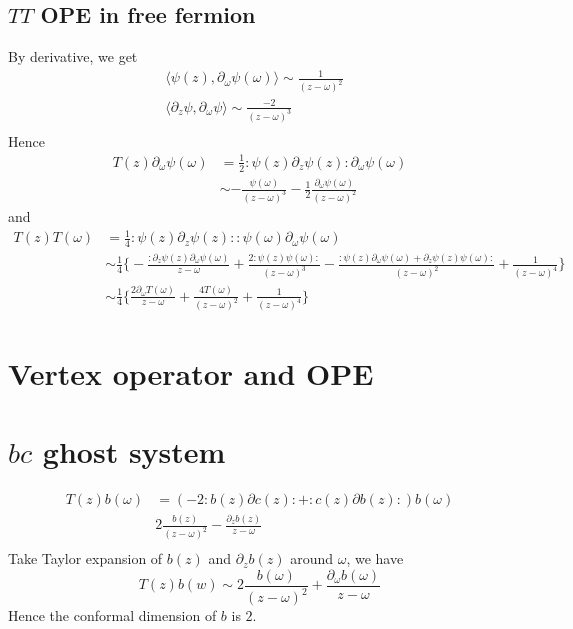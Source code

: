 \documentclass[11pt,a4paper]{article}
\theoremstyle{definition}
\begin{document}
 \subsection{$TT$ OPE in free fermion}
By derivative, we get 
\[
\begin{aligned}
\langle \psi (z), \partial_\omega \psi(\omega) \rangle \sim \frac{1}{(z-\omega)^2}& \\
 \langle \partial_z \psi , \partial_\omega \psi \rangle \sim \frac{-2}{(z-\omega)^3}&\\
\end{aligned}
\]
Hence 
\[
\begin{aligned}
T(z) \partial_\omega \psi(\omega) & = \frac{1}{2} : \psi(z) \partial_z \psi(z): \partial_\omega \psi(\omega)\\
& \sim -\frac{\psi(\omega)}{(z-\omega)^3} - \frac{1}{2} \frac{\partial_\omega \psi (\omega)}{(z-\omega)^2}
\end{aligned}
\]
and 
\[
\begin{aligned}
T(z)T(\omega) &= \frac{1}{4} : \psi(z) \partial_z \psi(z) :: \psi(\omega) \partial_\omega \psi(\omega)\\
& \sim \frac{1}{4} \big\{ - \frac{:\partial_z \psi(z) \partial_\omega \psi(\omega)}{z-\omega} + \frac{2: \psi(z) \psi(\omega):}{(z-\omega)^3} - \frac{: \psi(z) \partial_\omega \psi(\omega) + \partial_z \psi(z) \psi(\omega):}{(z-\omega)^2} + \frac{1}{(z-\omega)^4} \big\}\\
&\sim \frac{1}{4} \big\{\frac{2 \partial_\omega T(\omega)}{z-\omega} + \frac{4T(\omega)}{(z-\omega)^2} + \frac{1}{(z-\omega)^4}  \big\}
\end{aligned}
\]
 \section{Vertex operator and OPE}
 \section{$bc$ ghost system}
 \[
 \begin{aligned}
 T(z) b(\omega) & = (-2: b(z) \partial c(z): + :c(z) \partial b(z):) b(\omega)\\
 & 2 \frac{b(z)}{(z-\omega)^2} - \frac{\partial_z b(z)}{z-\omega}\\
 \end{aligned}
 \]
 Take Taylor expansion of $b(z)$ and $\partial_z b(z)$ around $\omega$, we have
 \[
 T(z)b(w) \sim 2\frac{b(\omega)}{(z-\omega)^2} + \frac{\partial_\omega b(\omega)}{z-\omega}
 \]
 Hence the conformal dimension of $b$ is $2$.
 
\end{document}
